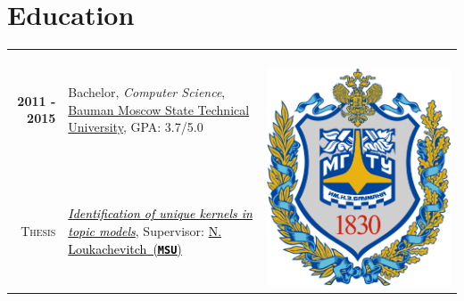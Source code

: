 \documentclass[a4paper,10pt]{article} %
\begin{document}

\section{Education}

\begin{tabular}{rp{14cm}c}	
\textbf{2011 -  2015} & Bachelor, \emph{Computer Science}, \href{http://www.bmstu.ru/en/}{Bauman Moscow State Technical University}, GPA: 3.7/5.0 & \multirow{2}{*}{~~~~~\includegraphics[scale=0.012]{img/bmstu}}\\
\textsc{Thesis} &\emph{\href{https://github.com/ars-ashuha/bigram-anchor-words}{\textcolor{black}{Identification of unique kernels in topic models}}}, Supervisor:  \href{http://istina.msu.ru/profile/louk_nat/}{\textcolor{black}{N. Loukachevitch~(\texttt{\textbf{MSU}})}}
\end{tabular}
\end{document}
